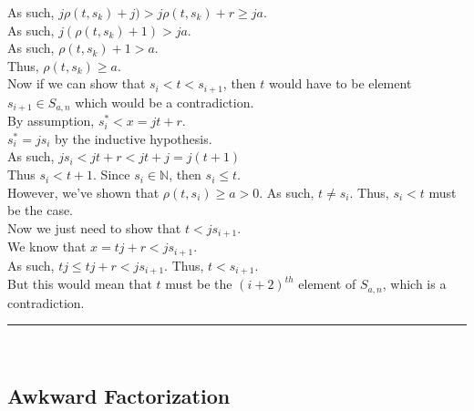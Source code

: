 \documentclass[a4paper,12pt]{article}
\begin{document}
\noindent As such, $j \rho(t, s_k) + j) > j \rho(t, s_k) + r \geq ja$.\\

\noindent As such, $j(\rho(t, s_k) + 1) > ja$.\\

\noindent As such, $\rho(t, s_k) + 1 > a$.\\

\noindent Thus, $\rho(t, s_k) \geq a$.\\

\noindent Now if we can show that $s_i < t < s_{i+1}$, then $t$ would have to be element $s_{i + 1} \in S_{a, n}$ which would be a contradiction.\\

\noindent By assumption, $s^*_i < x = jt + r$.\\

\noindent $s^*_i = js_i$ by the inductive hypothesis.\\

\noindent As such, $js_i < jt + r < jt + j = j(t + 1)$\\

\noindent Thus $s_i < t + 1$. Since $s_i \in \mathbb{N}$, then $s_i \leq t$.\\

\noindent However, we've shown that $\rho(t, s_i) \geq a > 0$. As such, $t \neq s_i$. Thus, $s_i < t$ must be the case.\\

\noindent Now we just need to show that $t < js_{i + 1}$.\\

\noindent We know that $x = tj + r < js_{i+1}$.\\

\noindent As such, $tj \leq tj + r < js_{i+1}$. Thus, $t < s_{i + 1}$.\\

\noindent But this would mean that $t$ must be the $(i + 2)^{th}$ element of $S_{a, n}$, which is a contradiction.


\begin{center}
\noindent\rule{8cm}{0.4pt}
\end{center}
\noindent \\













\subsection{Awkward Factorization}
\label{subsection:awkward_factorization}
\end{document}
